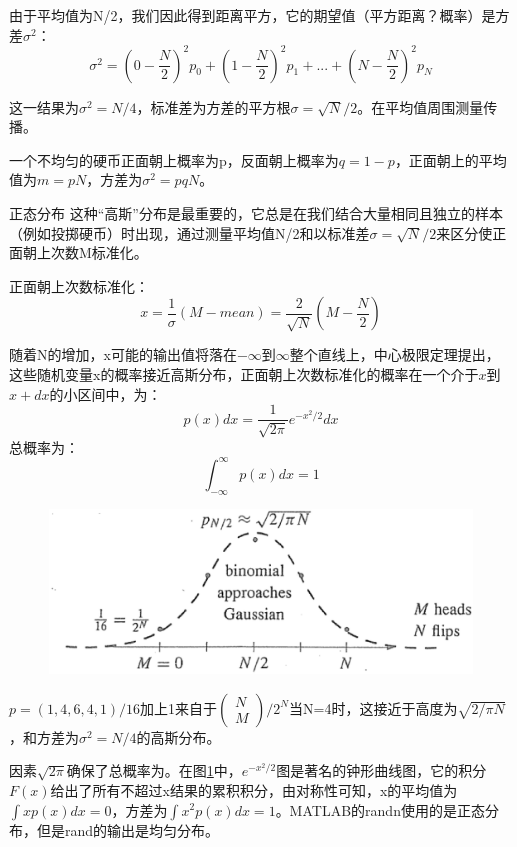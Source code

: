 	由于平均值为N/2，我们因此得到距离平方，它的期望值（平方距离？概率）是方差$\sigma^2$：
	\begin{equation*}
	\sigma^2=(0-\frac{N}{2})^2p_0 + (1-\frac{N}{2})^2p_1 + ...+ (N-\frac{N}{2})^2p_N
	\end{equation*}
	
	这一结果为$\sigma^2=N/4$，标准差为方差的平方根$\sigma=\sqrt{N}/2$。在平均值周围测量传播。
	
	一个不均匀的硬币正面朝上概率为p，反面朝上概率为$q=1-p$，正面朝上的平均值为$m=pN$，方差为$\sigma^2=pqN$。
	
	正态分布 \quad 这种“高斯”分布是最重要的，它总是在我们结合大量相同且独立的样本（例如投掷硬币）时出现，通过测量平均值N/2和以标准差$\sigma=\sqrt{N}/2$来区分使正面朝上次数M标准化。
	
	正面朝上次数标准化：
	\begin{equation*}
	x=\frac{1}{\sigma}(M-mean)=\frac{2}{\sqrt{N}}(M-\frac{N}{2})
	\end{equation*}
	
	随着N的增加，x可能的输出值将落在$-\infty$到$\infty$整个直线上，中心极限定理提出，这些随机变量x的概率接近高斯分布，正面朝上次数标准化的概率在一个介于$x$到$x+dx$的小区间中，为：
	\begin{equation}
	p(x)dx=\frac{1}{\sqrt{2\pi}}e^{-x^{2}/2}dx
	\end{equation}
	总概率为：
	\begin{equation*}
	\int^{\infty}_{-\infty}p(x)dx=1	
	\end{equation*}
	\begin{figure}
		\centering
		\includegraphics[width=0.7\linewidth]{TeX_files/Part02/chapter04/image/4-3}
		\caption{}
		\label{fig:4-3}
	\end{figure}
	
	$p=(1,4,6,4,1)/16$加上1来自于$\begin{pmatrix}
	N \\ M
	\end{pmatrix}/2^N$当N=4时，这接近于高度为$\sqrt{2/\pi N}$，和方差为$\sigma^2=N/4$的高斯分布。
	
	因素$\sqrt{2\pi}$确保了总概率为。在图\ref{fig:4-3}中，$e^{-x^{2}/2}$图是著名的钟形曲线图，它的积分$F(x)$给出了所有不超过x结果的累积积分，由对称性可知，x的平均值为$\int
	xp(x)dx=0$，方差为$\int x^2p(x)dx=1$。MATLAB的randn使用的是正态分布，但是rand的输出是均匀分布。
	
